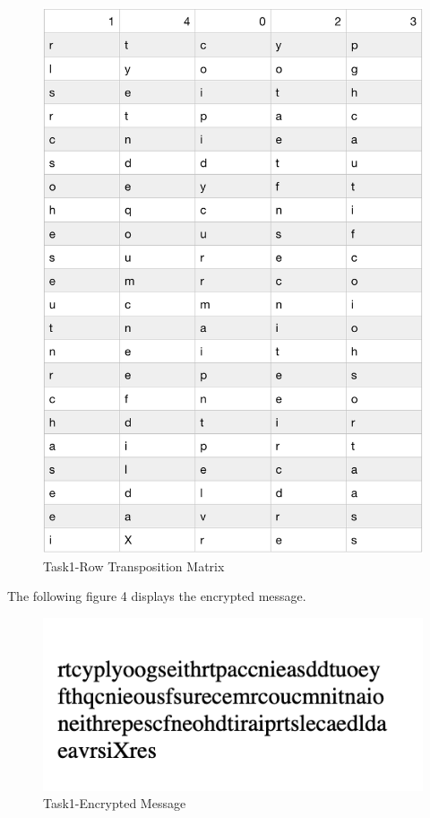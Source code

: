 \documentclass[twoside,twocolumn]{article}
\begin{document}
\begin{figure}[H]
  \centering
  \includegraphics[scale=0.45]{./Graphs/Figure1.3.png}
  \caption{Task1-Row Transposition Matrix}
  \label{fig:testfig1}
\end{figure}

The following figure 4 displays the encrypted message.

\begin{figure}[H]
  \centering
  \includegraphics[scale=0.75]{./Graphs/Figure1.4.png}
  \caption{Task1-Encrypted Message}
  \label{fig:testfig1}
\end{figure}
\end{document}
